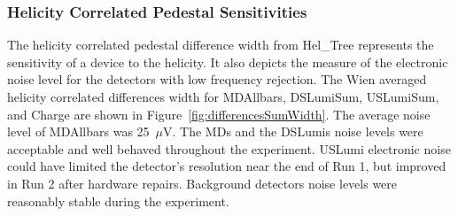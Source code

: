 \subsubsection{Helicity Correlated Pedestal Sensitivities}
\label{Helicity Correlated Pedestal Sensitivities}
The helicity correlated pedestal difference width from Hel\_Tree represents the sensitivity of a device to the helicity. It also depicts the measure of the electronic noise level for the detectors with low frequency rejection. The Wien averaged helicity correlated differences width for MDAllbars, DSLumiSum, USLumiSum, and Charge are shown in Figure~\ref{fig:differencesSumWidth}. The average noise level of MDAllbars was 25~$\mu$V.
The MDs and the DSLumis noise levels were acceptable and well behaved throughout the experiment. USLumi electronic noise could have limited the detector's resolution near the end of Run 1, but improved in Run 2 after hardware repairs. Background detectors noise levels were reasonably stable during the experiment.


